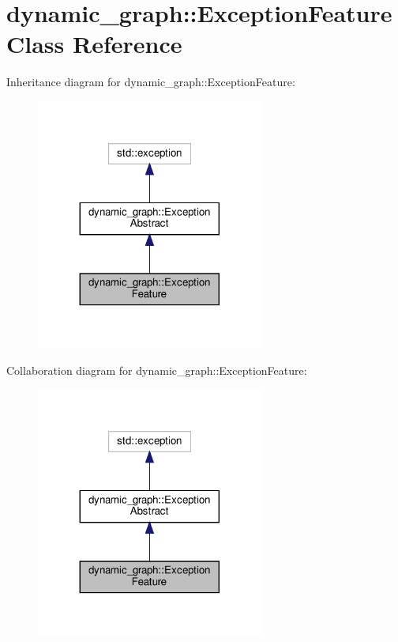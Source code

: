 \hypertarget{classdynamic__graph_1_1ExceptionFeature}{}\section{dynamic\+\_\+graph\+:\+:Exception\+Feature Class Reference}
\label{classdynamic__graph_1_1ExceptionFeature}


Inheritance diagram for dynamic\+\_\+graph\+:\+:Exception\+Feature\+:
\nopagebreak
\begin{figure}[H]
\begin{center}
\leavevmode
\includegraphics[width=212pt]{classdynamic__graph_1_1ExceptionFeature__inherit__graph}
\end{center}
\end{figure}


Collaboration diagram for dynamic\+\_\+graph\+:\+:Exception\+Feature\+:
\nopagebreak
\begin{figure}[H]
\begin{center}
\leavevmode
\includegraphics[width=212pt]{classdynamic__graph_1_1ExceptionFeature__coll__graph}
\end{center}
\end{figure}
